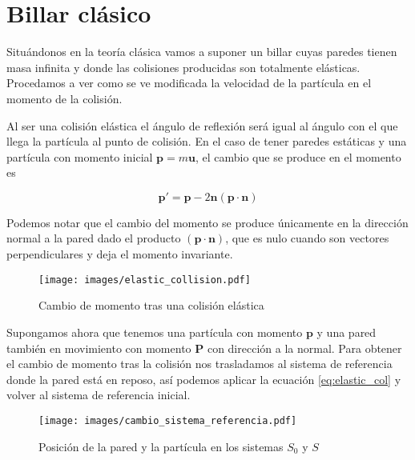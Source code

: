 \documentclass[11pt, spanish]{book}
\begin{document}
\section{Billar clásico}

Situándonos en la teoría clásica vamos a suponer un billar cuyas paredes tienen masa infinita y donde las colisiones producidas son totalmente elásticas. Procedamos a ver como se ve modificada la velocidad de la partícula en el momento de la colisión.

\vspace{3mm}

Al ser una colisión elástica el ángulo de reflexión será igual al ángulo con el que llega la partícula al punto de colisión. En el caso de tener paredes estáticas y una partícula con momento inicial \( \mathbf{p} = m\mathbf{u}\), el cambio que se produce en el momento es 

\begin{equation}\label{eq:elastic_col}
    \mathbf{p}' = \mathbf{p} - 2\mathbf{n}(\mathbf{p} \cdot \mathbf{n})
\end{equation}

Podemos notar que el cambio del momento se produce únicamente en la dirección normal a la pared dado el producto \( (\mathbf{p} \cdot \mathbf{n}) \), que es nulo cuando son vectores perpendiculares y deja el momento invariante.

\begin{figure}[H]
    \centering
    \texttt{[image: images/elastic\_collision.pdf]}
    \caption{Cambio de momento tras una colisión elástica}
    \label{fig:elastic_col}
\end{figure}

\vspace{3mm}

Supongamos ahora que tenemos una partícula con momento \( \mathbf{p} \) y una pared también en movimiento con momento \( \mathbf{P} \) con dirección a la normal. Para obtener el cambio de momento tras la colisión nos trasladamos al sistema de referencia donde la pared está en reposo, así podemos aplicar la ecuación \ref{eq:elastic_col} y volver al sistema de referencia inicial.

\begin{figure}[H]
    \centering
    \texttt{[image: images/cambio\_sistema\_referencia.pdf]}
    \caption{Posición de la pared y la partícula en los sistemas $S_0$ y $S$}
    \label{fig:cambio_referencia}
\end{figure}
\end{document}
